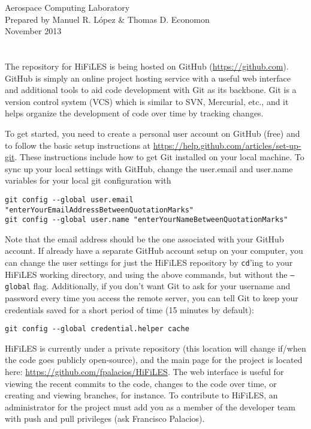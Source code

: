 \documentclass[letter,10pt]{article}
\title{\TitleFont{\vspace{-1cm}\bf{HiFiLES Quick Reference Guide \vspace{-2cm}}}}
\date{}
\newcommand*{\TitleFont}{%
      \usefont{\encodingdefault}{\rmdefault}{b}{n}%
      \fontsize{10}{20}%
      \selectfont}
\begin{document}
\begin{flushleft}
Aerospace Computing Laboratory\\
Prepared by Manuel R. L\'opez \& Thomas D. Economon\\
November 2013
\end{flushleft}

\begingroup
\let\newpage\relax%
\let\date\relax
\let\author\relax
\maketitle
\endgroup
{}

\section*{\TitleFont{Developing HiFiLES through Git + GitHub}}

The repository for HiFiLES is being hosted on GitHub (\url{https://github.com}). GitHub is simply an online project hosting service with a useful web interface and additional tools to aid code development with Git as its backbone. Git is a version control system (VCS) which is similar to SVN, Mercurial, etc., and it helps organize the development of code over time by tracking changes. 

To get started, you need to create a personal user account on GitHub (free) and to follow the basic setup instructions at
\url{https://help.github.com/articles/set-up-git}. These instructions include how to get Git installed on your local machine. To sync up your local settings with GitHub, change the user.email and user.name variables for your local git configuration with
\begin{verbatim}git config --global user.email "enterYourEmailAddressBetweenQuotationMarks" 
git config --global user.name "enterYourNameBetweenQuotationMarks"
\end{verbatim}
Note that the email address should be the one associated with your GitHub account.  If already have a separate GitHub account setup on your computer, you can change the user settings for just the HiFiLES repository by \texttt{cd}'ing to your HiFiLES working directory, and using the above commands, but without the \texttt{--global} flag.  Additionally, if you don't want Git to ask for your username and password every time you access the remote server, you can tell Git to keep your credentials saved for a short period of time (15 minutes by default):
\begin{verbatim}
git config --global credential.helper cache
\end{verbatim}
HiFiLES is currently under a private repository (this location will change if/when the code goes publicly open-source), and the main page for the project is located here: \url{https://github.com/fpalacios/HiFiLES}. The web interface is useful for viewing the recent commits to the code, changes to the code over time, or creating and viewing branches, for instance. To contribute to HiFiLES, an administrator for the project must add you as a member of the developer team with push and pull privileges (ask Francisco Palacios). 
\end{document}
